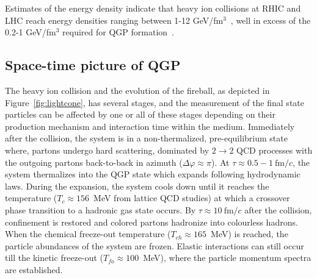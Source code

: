 Estimates of the energy density indicate that heavy ion collisions at RHIC and LHC  reach energy densities ranging between 1-12 GeV/fm$^3$~\cite{PhysRevC.93.024901,PhysRevC.94.034903}, well in excess of the 0.2-1 GeV/fm\(^3\) required for QGP formation~\cite{PhysRevD.90.094503, Karsch2002}. 
%


\subsection{Space-time picture of QGP}
\label{sec:qgpSpacetime}
The heavy ion collision and the evolution of the fireball, as depicted in Figure~\ref{fig:lightcone}, has several stages, and the measurement of the final state particles can be affected by one or all of these stages depending on their production mechanism and interaction time within the medium. 
%
Immediately after the collision, the system is in a non-thermalized, pre-equilibrium state where, partons undergo hard scattering, dominated by \(2\to 2\) QCD processes with the outgoing partons back-to-back in azimuth (\(\Delta \varphi \approx \pi\)). 
%
At \(\tau \approx 0.5 - 1~\text{fm}/c\), the system thermalizes into the QGP state which expands following hydrodynamic laws. 
%
During the expansion, the system cools down until it reaches the temperature (\(T_c \approx 156\)~MeV from lattice QCD studies) at which a crossover phase transition to a hadronic gas state occurs. 
%
By \(\tau \approx 10~\text{fm}/c\) after the collision, confinement is restored and colored partons hadronize into colourless hadrons.
%
When the chemical freeze-out temperature (\(T_{ch} \approx 165\)~MeV) is reached, the particle abundances of the system are frozen. 
%
Elastic interactions can still occur till the kinetic freeze-out (\(T_{fo} \approx 100\)~MeV), where the particle momentum spectra are established.


